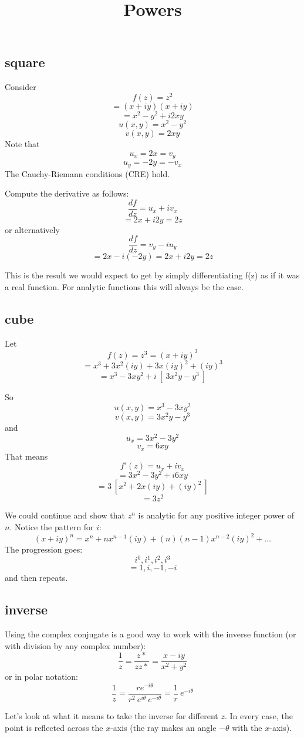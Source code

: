 \documentclass[11pt, oneside]{article}
\title{Powers}
\date{}
\begin{document}
\maketitle
\Large

\subsection*{square}
Consider 
\[ f(z) = z^2 \]
\[ = (x + iy)(x + iy) \]
\[ = x^2 - y^2 + i2xy \]
\[ u(x,y) = x^2 - y^2 \]
\[ v(x,y) = 2xy \]
Note that
\[ u_x = 2x = v_y \]
\[ u_y = -2y = - v_x \]
The Cauchy-Riemann conditions (CRE) hold.

Compute the derivative as follows:
\[ \frac{df}{dz} = u_x + i v_x \]
\[ = 2x + i 2y = 2z \]
or alternatively
\[ \frac{df}{dz} = v_y - i u_y \]
\[ = 2x - i (-2y) = 2x + i2y = 2z \]

This is the result we would expect to get by simply differentiating f(z) as if it was a real function. For analytic functions this will always be the case.

\subsection*{cube}
Let
\[ f(z) = z^3 = (x + iy)^3 \]
\[ = x^3 + 3x^2(iy) + 3x(iy)^2 + (iy)^3 \]
\[ = x^3 - 3xy^2 + i \ [ \ 3x^2y - y^3 \ ] \]

So
\[ u(x,y) = x^3 - 3xy^2 \]
\[ v(x,y) = 3x^2y - y^3 \]
and
\[ u_x = 3x^2 - 3y^2 \]
\[ v_x = 6xy \]
That means
\[ f'(z) = u_x + i v_x \]
\[ = 3x^2 - 3y^2 + i 6xy \]
\[ = 3 \ [ x^2 + 2x(iy) + (iy)^2 \ ] \]
\[ = 3z^2 \]

We could continue and show that $z^n$ is analytic for any positive integer power of $n$.
Notice the pattern for $i$:
\[ (x + iy)^n = x^n + nx^{n-1}(iy) + (n)(n-1)x^{n-2}(iy)^2 + \dots \]
The progression goes:
\[ i^0, i^1, i^2, i^3 \]
\[ = 1, i, -1, -i \]
and then repeats.

\subsection*{inverse}
Using the complex conjugate is a good way to work with the inverse function (or with division by any complex number):
\[ \frac{1}{z} = \frac{z*}{zz*} = \frac{x - iy}{x^2 + y^2} \]
or in polar notation:
\[  \frac{1}{z} =  \frac{r e^{-i \theta}}{r^2 \ e^{i \theta} \ e^{-i \theta}} = \frac{1}{r} \ e^{-i \theta} \]

Let's look at what it means to take the inverse for different $z$.  In every case, the point is reflected across the $x$-axis (the ray makes an angle $- \theta$ with the $x$-axis).  
\end{document}
